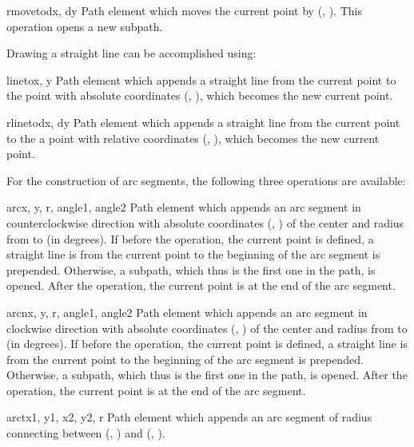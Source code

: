 \begin{classdesc}{rmoveto}{dx, dy}
Path element which moves the current point by (, ).
This operation opens a new subpath.
\end{classdesc}

Drawing a straight line can be accomplished using:

\begin{classdesc}{lineto}{x, y}
Path element which appends a straight line from the current point to the
point with absolute coordinates (, ), which becomes
the new current point.
\end{classdesc}

\begin{classdesc}{rlineto}{dx, dy}
Path element which appends a straight line from the current point to the
a point with relative coordinates (, ), which becomes
the new current point.
\end{classdesc}

For the construction of arc segments, the following three operations
are available:

\begin{classdesc}{arc}{x, y, r, angle1, angle2}
Path element which appends an arc segment in counterclockwise direction
with absolute coordinates (, ) of the center and 
radius  from  to  (in degrees).
If before the operation, the current point is defined, a straight line
is from the current point to the beginning of the arc segment is
prepended. Otherwise, a subpath, which thus is the first one in the
path, is opened. After the operation, the current point is at the end
of the arc segment.
\end{classdesc}

\begin{classdesc}{arcn}{x, y, r, angle1, angle2}
Path element which appends an arc segment in clockwise direction
with absolute coordinates (, ) of the center and 
radius  from  to  (in degrees).
If before the operation, the current point is defined, a straight line
is from the current point to the beginning of the arc segment is
prepended. Otherwise, a subpath, which thus is the first one in the
path, is opened. After the operation, the current point is at the end
of the arc segment.
\end{classdesc}

\begin{classdesc}{arct}{x1, y1, x2, y2, r}
Path element which appends an arc segment of radius 
connecting between (, ) and (, ).\\
\end{classdesc}

